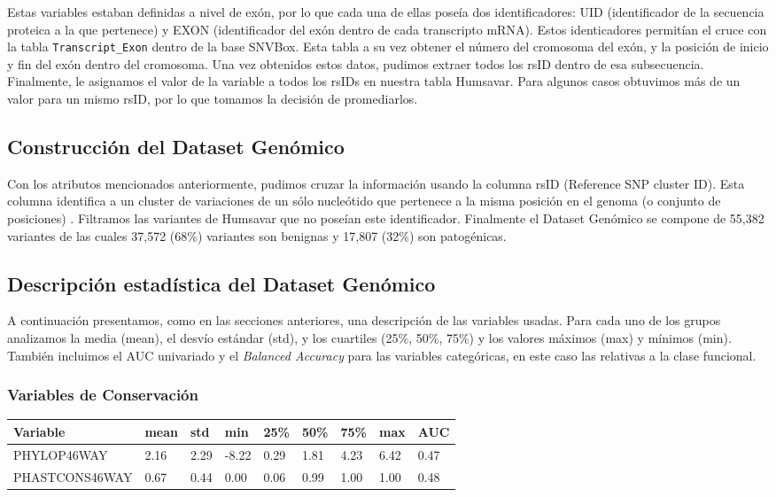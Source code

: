 Estas variables estaban definidas a nivel de exón, por lo que cada una de ellas poseía dos identificadores: UID (identificador de la secuencia proteica a la que pertenece) y EXON (identificador del exón dentro de cada transcripto mRNA). Estos identicadores permitían el cruce con la tabla \texttt{Transcript\_Exon} dentro de la base SNVBox. Esta tabla a su vez obtener el número del cromosoma del exón, y la posición de inicio y fin del exón dentro del cromosoma. Una vez obtenidos estos datos, pudimos extraer todos los rsID dentro de esa subsecuencia. Finalmente, le asignamos el valor de la variable a todos los rsIDs en nuestra tabla Humsavar. Para algunos casos obtuvimos más de un valor para un mismo rsID, por lo que tomamos la decisión de promediarlos.


\subsection{Construcción del Dataset Genómico}

Con los atributos mencionados anteriormente, pudimos cruzar la información usando la columna rsID (Reference SNP cluster ID). Esta columna identifica a un cluster de variaciones de un sólo nucleótido que pertenece a la misma posición en el genoma (o conjunto de posiciones) \cite{Ostell2007}. Filtramos las variantes de Humsavar que no poseían este identificador. Finalmente el Dataset Genómico se compone de 55,382 variantes de las cuales 37,572 (68\%) variantes son benignas y 17,807 (32\%) son patogénicas. 

\subsection{Descripción estadística del Dataset Genómico}

A continuación presentamos, como en las secciones anteriores, una descripción de las variables usadas. Para cada uno de los grupos analizamos la media (mean), el desvío estándar (std), y los cuartiles (25\%, 50\%, 75\%) y los valores máximos (max) y mínimos (min). También incluimos el AUC univariado y el \textit{Balanced Accuracy} para las variables categóricas, en este caso las relativas a la clase funcional.

\subsubsection{Variables de Conservación}
\begin{table}[H]
\centering
\begin{tabular}{|l|l|l|l|l|l|l|l|l|}
\hline
Variable & mean & std & min & 25\%  & 50\% & 75\%  & max & AUC \\ \hline
PHYLOP46WAY & 2.16 &  2.29 & -8.22 &  0.29 &  1.81 &  4.23 &  6.42 & 0.47 \\ \hline
PHASTCONS46WAY & 0.67 & 0.44 &  0.00 &  0.06 &  0.99 &  1.00 &  1.00 & 0.48 \\ \hline
\end{tabular}
\end{table}

